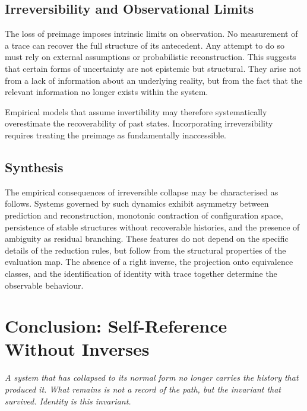 \documentclass[12pt, oneside]{amsbook}
\theoremstyle{plain}
\theoremstyle{definition}
\theoremstyle{remark}
\begin{document}
\section{Irreversibility and Observational Limits}
\label{sec:empirical:limits}

The loss of preimage imposes intrinsic limits on observation. No measurement of
a trace can recover the full structure of its antecedent. Any attempt to do so
must rely on external assumptions or probabilistic reconstruction. This suggests
that certain forms of uncertainty are not epistemic but structural. They arise
not from a lack of information about an underlying reality, but from the fact
that the relevant information no longer exists within the system.

Empirical models that assume invertibility may therefore systematically
overestimate the recoverability of past states. Incorporating irreversibility
requires treating the preimage as fundamentally inaccessible.

\section{Synthesis}
\label{sec:empirical:synthesis}

The empirical consequences of irreversible collapse may be characterised as
follows. Systems governed by such dynamics exhibit asymmetry between prediction
and reconstruction, monotonic contraction of configuration space, persistence
of stable structures without recoverable histories, and the presence of
ambiguity as residual branching. These features do not depend on the specific
details of the reduction rules, but follow from the structural properties of
the evaluation map. The absence of a right inverse, the projection onto
equivalence classes, and the identification of identity with trace together
determine the observable behaviour.

\chapter{Conclusion: Self-Reference Without Inverses}
\label{ch:conclusion}

\textit{A system that has collapsed to its normal form no longer carries the
  history that produced it. What remains is not a record of the path, but the
  invariant that survived. Identity is this invariant.}
\end{document}
